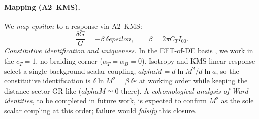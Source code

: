 \documentclass[aps,prd,onecolumn,superscriptaddress,nofootinbib]{revtex4-2}
\def\eps{epsilon}%
\def\alpha{alpha}%
\def\alpha_M{alphaM}%
\providecommand{\eps}{\varepsilon}
\begin{document}
\paragraph{Mapping (A2–KMS).} We \emph{map} $\eps$ to a response via A2–KMS:
\begin{equation}
\label{eq:mapping}
\frac{\delta G}{G}=-\beta\,\delta\eps,\qquad \beta=2\pi C_T I_{00}.
\end{equation}
\noindent\emph{Constitutive identification and uniqueness.} In the EFT-of-DE basis \cite{BelliniSawicki2014}, we work in the $c_T=1$, no-braiding corner ($\alpha_T=\alpha_B=0$). Isotropy and KMS linear response select a single background scalar coupling, $\alpha_M=d\ln M^2/d\ln a$, so the constitutive identification is $\delta\ln M^2=\beta\,\delta\varepsilon$ at working order while keeping the distance sector GR-like ($\alpha_M\simeq 0$ there). A \emph{cohomological analysis of Ward identities}, to be completed in future work, is expected to confirm $M^2$ as the sole scalar coupling at this order; failure would \emph{falsify} this closure.
\end{document}
